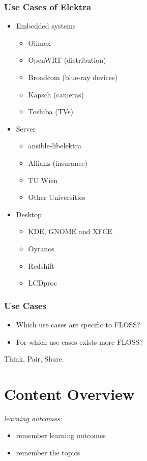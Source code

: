 \begin{frame}
	\frametitle{Use Cases of Elektra}
	\begin{itemize}[<+-| alert@+>]
	\item Embedded systems
	\begin{itemize}
	\item Olimex
	\item OpenWRT (distribution)
	\item Broadcom (blue-ray devices)
	\item Kapsch (cameras)
	\item Toshiba (TVs)
	\end{itemize}
	\item Server
	\begin{itemize}
	\item ansible-libelektra
	\item Allianz (insurance)
	\item TU Wien
	\item Other Universities
	\end{itemize}
	\item Desktop
	\begin{itemize}
	\item KDE, GNOME and XFCE
	\item Oyranos
	\item Redshift
	\item LCDproc
	\end{itemize}
	\end{itemize}
\end{frame}

\begin{assignment}
	\frametitle{Use Cases}
	\begin{itemize}
		\item Which use cases are specific to FLOSS?
		\item For which use cases exists more FLOSS?
	\end{itemize}

	\begin{task}
	Think, Pair, Share.
	\end{task}
\end{assignment}

\section{Content Overview}

\begin{frame}
	\textit{learning outcomes:}
	\begin{itemize}
		\item remember learning outcomes
		\item remember the topics
	\end{itemize}
\end{frame}

